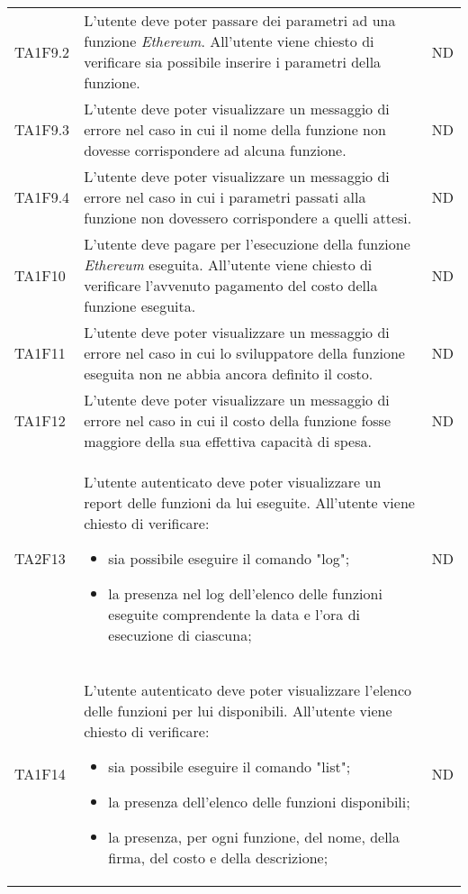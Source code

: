 \begin{longtable}{|C{1.5cm}|C{9cm}|C{3cm}|}
	TA1F9.2  &
	L’utente deve poter passare dei parametri ad una funzione \textit{Ethereum\glos}. All’utente viene chiesto di verificare sia possibile inserire i parametri della funzione. &
	ND \\

	TA1F9.3  &
	L’utente deve poter visualizzare un messaggio di errore nel caso in cui il nome della funzione non dovesse corrispondere ad alcuna funzione. &
	ND \\

	TA1F9.4  &
	L’utente deve poter visualizzare un messaggio di errore nel caso in cui i parametri passati alla funzione non dovessero corrispondere a quelli attesi. &
	ND \\

	TA1F10  &
	L’utente deve pagare per l'esecuzione della funzione \textit{Ethereum\glos} eseguita.
	All’utente viene chiesto di verificare l'avvenuto pagamento del costo della funzione eseguita. &
	ND \\

	TA1F11  &
	L’utente deve poter visualizzare un messaggio di errore nel caso in cui lo sviluppatore della funzione eseguita non ne abbia ancora definito il costo. &
	ND \\

	TA1F12  &
	L’utente deve poter visualizzare un messaggio di errore nel caso in cui il costo della funzione fosse maggiore della sua effettiva capacità di spesa. &
	ND \\

	TA2F13  &
	L’utente autenticato deve poter visualizzare un report delle funzioni da lui eseguite. All’utente viene chiesto di verificare:
	\begin{itemize}
		\item sia possibile eseguire il comando "log";
		\item la presenza nel log dell'elenco delle funzioni eseguite comprendente la data e l'ora di esecuzione di ciascuna;
	\end{itemize} &
	ND \\[-5ex]

	TA1F14  &
	L’utente autenticato deve poter visualizzare l'elenco delle funzioni per lui disponibili. All’utente viene chiesto di verificare:
	\begin{itemize}
		\item sia possibile eseguire il comando "list";
		\item la presenza dell'elenco delle funzioni disponibili;
		\item la presenza, per ogni funzione, del nome, della firma, del costo e della descrizione;
	\end{itemize} &
	ND \\[-5ex]


\end{longtable}
